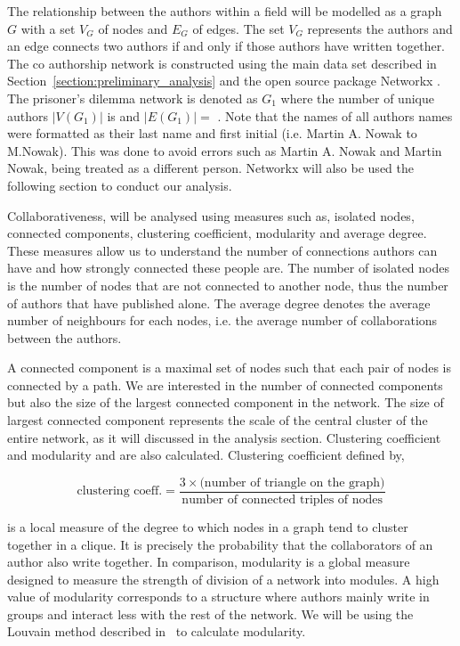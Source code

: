 \documentclass{article}
\theoremstyle{definition}
\newcommand{\authors}{}
\newcommand{\edges}{}
\begin{document}
The relationship between the authors within a field will be modelled as a graph \(G\) with
a set \(V_G\) of nodes and \(E_G\) of edges. The set \(V_G\) represents the authors
and an edge connects two authors if and only if those authors have written together.
The co authorship network is constructed using the main data set described in
Section~\ref{section:preliminary_analysis} and the open source package Networkx
\cite{networkx}. The prisoner's dilemma network is denoted as \(G_1\) where the
number of unique authors \(|V(G_1)|\) is \authors and \(|E(G_1)|=\) \edges.
Note that the names of all authors names were formatted as their last name and
first initial (i.e. Martin A. Nowak to M.Nowak). This was done to avoid errors
such as Martin A. Nowak and Martin Nowak, being treated as a different person.
Networkx will also be used the following section to conduct our analysis.

Collaborativeness, will be analysed using measures such as, isolated nodes,
connected components, clustering coefficient, modularity and average degree.
These measures allow us to understand the number of connections authors can have
and how strongly connected these people are. The number of isolated nodes is the
number of nodes that are not connected to another node, thus the
number of authors that have published alone. The average degree denotes the average
number of neighbours for each nodes, i.e. the average number of collaborations
between the authors.

A connected component is a maximal set of nodes such that each pair of nodes is
connected by a path. We are interested in the number of connected components
but also the size of the largest connected component in the network.
The size of largest connected component represents the scale of the central cluster
of the entire network, as it will discussed in the analysis section.
Clustering coefficient and modularity and are also calculated.
Clustering coefficient defined by,

\[\text{clustering coeff.} =
\frac{3 \times \text{(number of triangle on the graph)}}{\text{number of connected triples of nodes}}\]

is a local measure of the degree to which nodes in a graph tend to cluster together
in a clique. It is precisely the probability that the collaborators
of an author also write together. In comparison, modularity is a global measure
designed to measure the strength of division of a network into modules. A high
value of modularity corresponds to a structure where authors mainly write
in groups and interact less with the rest of the network. We will be using the
Louvain method described in~\cite{Blondel2008} to calculate modularity.
\end{document}
